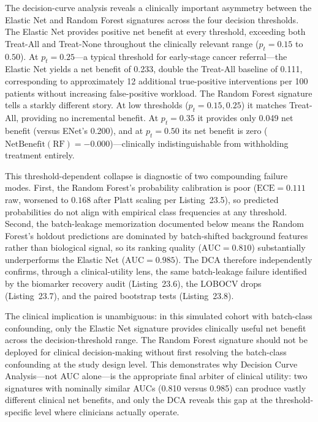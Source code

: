 \documentclass[11pt,oneside]{book}
\begin{document}
The decision-curve analysis reveals a clinically important asymmetry between the Elastic Net and Random Forest signatures across the four decision thresholds. The Elastic Net provides positive net benefit at every threshold, exceeding both Treat-All and Treat-None throughout the clinically relevant range ($p_t = 0.15$ to $0.50$). At $p_t = 0.25$---a typical threshold for early-stage cancer referral---the Elastic Net yields a net benefit of 0.233, double the Treat-All baseline of 0.111, corresponding to approximately 12 additional true-positive interventions per 100 patients without increasing false-positive workload. The Random Forest signature tells a starkly different story. At low thresholds ($p_t = 0.15, 0.25$) it matches Treat-All, providing no incremental benefit. At $p_t = 0.35$ it provides only 0.049 net benefit (versus ENet's 0.200), and at $p_t = 0.50$ its net benefit is zero ($\text{NetBenefit}(\text{RF}) = -0.000$)---clinically indistinguishable from withholding treatment entirely.

This threshold-dependent collapse is diagnostic of two compounding failure modes. First, the Random Forest's probability calibration is poor ($\text{ECE} = 0.111$ raw, worsened to $0.168$ after Platt scaling per Listing~23.5), so predicted probabilities do not align with empirical class frequencies at any threshold. Second, the batch-leakage memorization documented below means the Random Forest's holdout predictions are dominated by batch-shifted background features rather than biological signal, so its ranking quality ($\text{AUC} = 0.810$) substantially underperforms the Elastic Net ($\text{AUC} = 0.985$). The DCA therefore independently confirms, through a clinical-utility lens, the same batch-leakage failure identified by the biomarker recovery audit (Listing~23.6), the LOBOCV drops (Listing~23.7), and the paired bootstrap tests (Listing~23.8).

The clinical implication is unambiguous: in this simulated cohort with batch-class confounding, only the Elastic Net signature provides clinically useful net benefit across the decision-threshold range. The Random Forest signature should not be deployed for clinical decision-making without first resolving the batch-class confounding at the study design level. This demonstrates why Decision Curve Analysis---not AUC alone---is the appropriate final arbiter of clinical utility: two signatures with nominally similar AUCs (0.810 versus 0.985) can produce vastly different clinical net benefits, and only the DCA reveals this gap at the threshold-specific level where clinicians actually operate.
\end{document}
